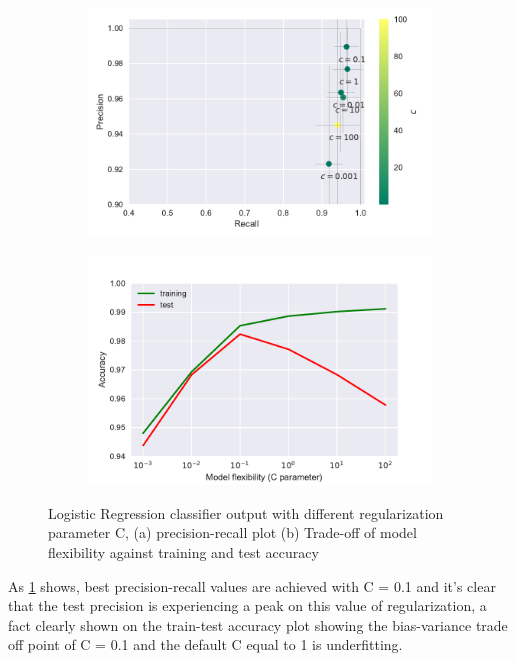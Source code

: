\documentclass[12pt, a4paper]{scrartcl}
\begin{document}
\begin{figure}
    \centering
    \begin{subfigure}[H]{0.45\textwidth}
        \includegraphics[width=\textwidth]{logistic_regression}
        \caption{}
        \label{fig:logistic_regression}
    \end{subfigure}
    \begin{subfigure}[H]{0.45\textwidth}
        \includegraphics[width=\textwidth]{lr_test_train_plot}
        \caption{}
        \label{fig:lr_test_train_plot}
    \end{subfigure}
    \caption{Logistic Regression classifier output with different regularization parameter C, (a) precision-recall plot (b) Trade-off of model flexibility against training and test accuracy}\label{fig:LR}
\end{figure}


As \cref{fig:logistic_regression} shows, best precision-recall values are achieved with C = 0.1 and it's clear that the test precision is experiencing a peak on this value of regularization, a fact clearly shown on the train-test accuracy plot showing the bias-variance trade off point of C = 0.1 and the default C equal to 1 is underfitting. 
\end{document}
